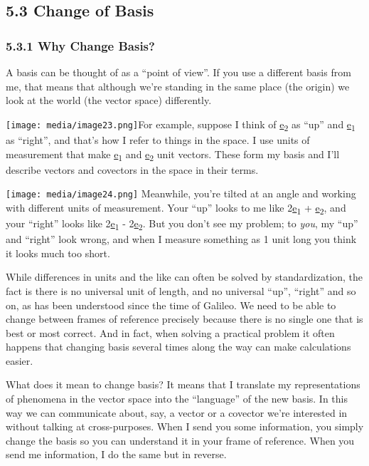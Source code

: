 \documentclass[oneside,english]{amsbook}
\numberwithin{section}{chapter}
\theoremstyle{plain}
\theoremstyle{definition}
\begin{document}
\subsection{5.3 Change of Basis}\label{change-of-basis}

\subsubsection{5.3.1 Why Change Basis?}\label{why-change-basis}

A basis can be thought of as a ``point of view''. If you use a different
basis from me, that means that although we're standing in the same place
(the origin) we look at the world (the vector space) differently.

\texttt{[image: media/image23.png]}For
example, suppose I think of \ul{e}\textsubscript{2} as ``up'' and
\ul{e}\textsubscript{1} as ``right'', and that's how I refer to things
in the space. I use units of measurement that make
\ul{e}\textsubscript{1} and \ul{e}\textsubscript{2} unit vectors. These
form my basis and I'll describe vectors and covectors in the space in
their terms.

\texttt{[image: media/image24.png]}
Meanwhile, you're tilted at an angle and working with different units of
measurement. Your ``up'' looks to me like 2\ul{e}\textsubscript{1} +
\ul{e}\textsubscript{2}, and your ``right'' looks like
2\ul{e}\textsubscript{1} - 2\ul{e}\textsubscript{2}. But you don't see
my problem; to \emph{you}, my ``up'' and ``right'' look wrong, and when
I measure something as 1 unit long you think it looks much too short.

While differences in units and the like can often be solved by
standardization, the fact is there is no universal unit of length, and
no universal ``up'', ``right'' and so on, as has been understood since
the time of Galileo. We need to be able to change between frames of
reference precisely because there is no single one that is best or most
correct. And in fact, when solving a practical problem it often happens
that changing basis several times along the way can make calculations
easier.

What does it mean to change basis? It means that I translate my
representations of phenomena in the vector space into the ``language''
of the new basis. In this way we can communicate about, say, a vector or
a covector we're interested in without talking at cross-purposes. When I
send you some information, you simply change the basis so you can
understand it in your frame of reference. When you send me information,
I do the same but in reverse.
\end{document}
